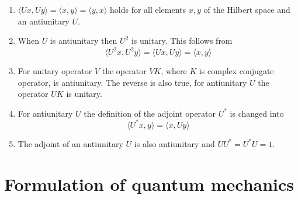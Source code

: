 \begin{newprop}
\begin{enumerate}
\item $\langle Ux,Uy\rangle =\overline {\langle x,y\rangle }=\langle y,x\rangle$ holds for all elements $x, y$ of the Hilbert space and an antiunitary $U$.
\item When $U$ is antiunitary then $U^{2}$ is unitary. This follows from
\[ \langle U^{2}x,U^{2}y\rangle =\overline {\langle Ux,Uy\rangle }=\langle x,y\rangle\]
\item For unitary operator $V$ the operator $VK$, where $K$ is complex conjugate operator, is antiunitary. The reverse is also true, for antiunitary $U$ the operator $UK$ is unitary.
\item For antiunitary $U$ the definition of the adjoint operator $U^{*}$ is changed into
\[\langle U^{*}x,y\rangle =\overline {\langle x,Uy\rangle }\]
\item The adjoint of an antiunitary $U$ is also antiunitary and $UU^{*}=U^{*}U=1$.
\end{enumerate}
\end{newprop}

\chapter{Formulation of quantum mechanics}
